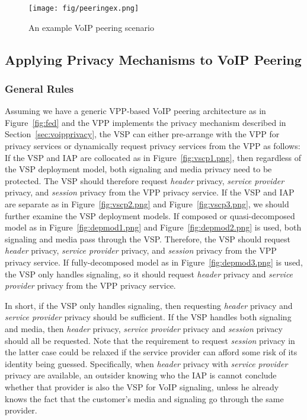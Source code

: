 \documentclass[letterpaper,notitlepage,times,12pt]{article}
\begin{document}
\begin{figure}[!tph]
\centerline{
    \texttt{[image: fig/peeringex.png]}
}
\caption{An example VoIP peering scenario}\label{fig:peeringex}
\end{figure}





\subsection{Applying Privacy Mechanisms to VoIP Peering} \label{sec:apppripeer}

\subsubsection{General Rules} \label{sec:apprule}

Assuming we have a generic VPP-based VoIP peering architecture as in Figure~\ref{fig:fed} and the VPP implements the privacy mechanism described in Section~\ref{sec:voipprivacy}, the VSP can either pre-arrange with the VPP for privacy services or dynamically request privacy services from the VPP as follows: If the VSP and IAP are collocated as in Figure~\ref{fig:vscp1.png}, then regardless of the VSP deployment model, both signaling and media privacy need to be protected. The VSP should therefore request {\it header} privacy, {\it service provider} privacy, and {\it session} privacy from the VPP privacy service. If the VSP and IAP are separate as in Figure~\ref{fig:vscp2.png} and Figure~\ref{fig:vscp3.png}, we should further examine the VSP deployment models. If composed or quasi-decomposed model as in Figure~\ref{fig:depmod1.png} and Figure~\ref{fig:depmod2.png} is used, both signaling and media pass through the VSP. Therefore, the VSP should request {\it header} privacy, {\it service provider} privacy, and {\it session} privacy from the VPP privacy service. If fully-decomposed model as in Figure~\ref{fig:depmod3.png} is used, the VSP only handles signaling, so it should request {\it header} privacy and {\it service provider} privacy from the VPP privacy service.

In short, if the VSP only handles signaling, then requesting {\it header} privacy and {\it service provider} privacy should be sufficient. If the VSP handles both signaling and media, then {\it header} privacy, {\it service provider} privacy and {\it session} privacy should all be requested. Note that the requirement to request {\it session} privacy in the latter case could be relaxed if the service provider can afford some risk of its identity being guessed. Specifically, when {\it header} privacy with {\it service provider} privacy are available, an outsider knowing who the IAP is cannot conclude whether that provider is also the VSP for VoIP signaling, unless he already knows the fact that the customer's media and signaling go through the same provider.
\end{document}
